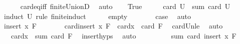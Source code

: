 \begin{isabellebody}
\ \ \ \ \isamarkupfalse%
\ card{\isacharunderscore}{\kern0pt}eq{\isacharunderscore}{\kern0pt}{}{\isacharunderscore}{\kern0pt}iff\ finite{\isacharunderscore}{\kern0pt}UnionD\ \isamarkupfalse%
\ auto\isanewline
{}\isamarkupfalse%
\isanewline
\ \ \isamarkupfalse%
\ True\isanewline
\ \ \isamarkupfalse%
\ \isamarkupfalse%
\ {\isachardoublequoteopen}card\ {\isacharparenleft}{\kern0pt}{\isasymUnion}U{\isacharparenright}{\kern0pt}\ {\isasymle}\ sum\ card\ U{\isachardoublequoteclose}\isanewline
\ \ \isamarkupfalse%
\ {\isacharparenleft}{\kern0pt}induct\ U\ rule{\isacharcolon}{\kern0pt}\ finite{\isacharunderscore}{\kern0pt}induct{\isacharparenright}{\kern0pt}\isanewline
\ \ \ \ \isamarkupfalse%
\ empty\isanewline
\ \ \ \ \isamarkupfalse%
\ \isamarkupfalse%
\ {\isacharquery}{\kern0pt}case\ \isamarkupfalse%
\ auto\isanewline
\ \ \isamarkupfalse%
\isanewline
\ \ \ \ \isamarkupfalse%
\ {\isacharparenleft}{\kern0pt}insert\ x\ F{\isacharparenright}{\kern0pt}\isanewline
\ \ \ \ \isamarkupfalse%
\ \isamarkupfalse%
\ {\isachardoublequoteopen}card{\isacharparenleft}{\kern0pt}{\isasymUnion}{\isacharparenleft}{\kern0pt}insert\ x\ F{\isacharparenright}{\kern0pt}{\isacharparenright}{\kern0pt}\ {\isasymle}\ card{\isacharparenleft}{\kern0pt}x{\isacharparenright}{\kern0pt}\ {\isacharplus}{\kern0pt}\ card\ {\isacharparenleft}{\kern0pt}{\isasymUnion}F{\isacharparenright}{\kern0pt}{\isachardoublequoteclose}\ \isamarkupfalse%
\ card{\isacharunderscore}{\kern0pt}Un{\isacharunderscore}{\kern0pt}le\ \isamarkupfalse%
\ auto\isanewline
\ \ \ \ \isamarkupfalse%
\ \isamarkupfalse%
\ {\isachardoublequoteopen}{\isachardot}{\kern0pt}{\isachardot}{\kern0pt}{\isachardot}{\kern0pt}\ {\isasymle}\ card{\isacharparenleft}{\kern0pt}x{\isacharparenright}{\kern0pt}\ {\isacharplus}{\kern0pt}\ sum\ card\ F{\isachardoublequoteclose}\ \isamarkupfalse%
\ insert{\isachardot}{\kern0pt}hyps\ \isamarkupfalse%
\ auto\isanewline
\ \ \ \ \isamarkupfalse%
\ \isamarkupfalse%
\ {\isachardoublequoteopen}{\isachardot}{\kern0pt}{\isachardot}{\kern0pt}{\isachardot}{\kern0pt}\ {\isacharequal}{\kern0pt}\ sum\ card\ {\isacharparenleft}{\kern0pt}insert\ x\ F{\isacharparenright}{\kern0pt}{\isachardoublequoteclose}\ \isamarkupfalse%

\end{isabellebody}
